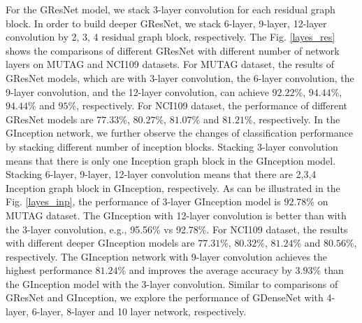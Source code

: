 \documentclass[journal]{IEEEtran}
\begin{document}
For the G\underline{\hspace{0.5em}}ResNet model, we stack 3-layer convolution for each residual graph block.
In order to build deeper G\underline{\hspace{0.5em}}ResNet, we stack 6-layer, 9-layer, 12-layer convolution by 2, 3, 4 residual graph block, respectively.
The Fig. \ref{layes_res} shows the comparisons of different G\underline{\hspace{0.5em}}ResNet with different number of network layers on MUTAG and NCI109 datasets.
For MUTAG dataset, the results of G\underline{\hspace{0.5em}}ResNet models, which are with  3-layer convolution, the 6-layer convolution, the 9-layer convolution, and the 12-layer convolution, can achieve $92.22\%$, $94.44\%$, $94.44\%$ and $95\%$, respectively.
For NCI109 dataset, the performance of different G\underline{\hspace{0.5em}}ResNet models are $77.33\%$, $80.27\%$, $81.07\%$ and $81.21\%$, respectively.
In the G\underline{\hspace{0.5em}}Inception network, we further observe the changes of classification performance by stacking different number of inception blocks. Stacking 3-layer convolution means that there is only one Inception graph block in the G\underline{\hspace{0.5em}}Inception model.
Stacking 6-layer, 9-layer, 12-layer convolution means that there are 2,3,4 Inception graph block in G\underline{\hspace{0.5em}}Inception, respectively.
As can be illustrated in the Fig. \ref{layes_inp}, the performance of 3-layer G\underline{\hspace{0.5em}}Inception model is $92.78\%$ on MUTAG dataset.
The G\underline{\hspace{0.5em}}Inception with 12-layer convolution is better than with the 3-layer convolution, e.g., 95.56\% vs 92.78\%.
For NCI109 dataset, the results with different deeper G\underline{\hspace{0.5em}}Inception models are $77.31\%$, $80.32\%$, $81.24\%$ and $80.56\%$, respectively. The G\underline{\hspace{0.5em}}Inception network with 9-layer convolution achieves the highest performance $81.24\%$ and improves the average accuracy by  $3.93\%$ than the G\underline{\hspace{0.5em}}Inception model with the 3-layer convolution.
Similar to comparisons of G\underline{\hspace{0.5em}}ResNet and G\underline{\hspace{0.5em}}Inception, we explore the performance of G\underline{\hspace{0.5em}}DenseNet with 4-layer, 6-layer, 8-layer and 10 layer network, respectively.
\end{document}
